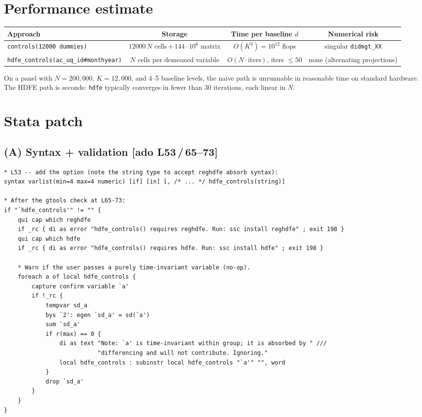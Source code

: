 \documentclass[11pt]{article}
\newcommand{\code}[1]{\texttt{\small #1}}
\newcommand{\Adoref}[1]{\textcolor{accent}{\footnotesize\textbf{[ado L#1]}}}
\newcommand{\1}{\mathbb{1}}
\begin{document}
\section{Performance estimate}

\begin{tabular}{@{}lccc@{}}
\toprule
Approach & Storage & Time per baseline $d$ & Numerical risk \\
\midrule
\code{controls(12000 dummies)}  &
  $12000\,N$ cells\,$+$\,$144{\cdot}10^6$ matrix &
  $O(K^3) = 10^{12}$ flops &
  singular \code{didmgt\_XX} \\
\code{hdfe\_controls(ac\_uq\_id\#monthyear)} &
  $N$ cells per demeaned variable &
  $O(N \cdot \text{iters})$, iters $\le 50$ &
  none (alternating projections) \\
\bottomrule
\end{tabular}

\medskip\noindent
On a panel with $N = 200{,}000$, $K = 12{,}000$, and 4--5 baseline levels,
the naive path is unrunnable in reasonable time on standard hardware. The
HDFE path is seconds: \code{hdfe} typically converges in fewer than 30
iterations, each linear in $N$.

\section{Stata patch}

\subsection*{(A) Syntax + validation \Adoref{53\,/\,65--73}}

\begin{lstlisting}
* L53 -- add the option (note the string type to accept reghdfe absorb syntax):
syntax varlist(min=4 max=4 numeric) [if] [in] [, /* ... */ hdfe_controls(string)]

* After the gtools check at L65-73:
if "`hdfe_controls'" != "" {
    qui cap which reghdfe
    if _rc { di as error "hdfe_controls() requires reghdfe. Run: ssc install reghdfe" ; exit 198 }
    qui cap which hdfe
    if _rc { di as error "hdfe_controls() requires hdfe. Run: ssc install hdfe" ; exit 198 }

    * Warn if the user passes a purely time-invariant variable (no-op).
    foreach a of local hdfe_controls {
        capture confirm variable `a'
        if !_rc {
            tempvar sd_a
            bys `2': egen `sd_a' = sd(`a')
            sum `sd_a'
            if r(max) == 0 {
                di as text "Note: `a' is time-invariant within group; it is absorbed by " ///
                           "differencing and will not contribute. Ignoring."
                local hdfe_controls : subinstr local hdfe_controls "`a'" "", word
            }
            drop `sd_a'
        }
    }
}
\end{lstlisting}
\end{document}
